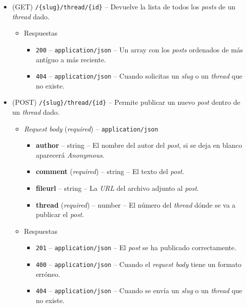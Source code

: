 \documentclass[12pt,a4paper,titlepage]{article}
\begin{document}
    \begin{itemize}
        \item (GET) \texttt{/\{slug\}/thread/\{id\}} -- Devuelve la lista de todos los \textit{posts} de un \textit{thread} dado.
        \begin{itemize}
            \item Respuestas
            \begin{itemize}
                \item \texttt{200} -- \texttt{application/json} -- Un array con los \textit{posts} ordenados de más antíguo a más reciente.
                \item \texttt{404} -- \texttt{application/json} -- Cuando solicitas un \textit{slug} o un \textit{thread} que no existe.
            \end{itemize}
        \end{itemize}
        \item (POST) \texttt{/\{slug\}/thread/\{id\}} -- Permite publicar un nuevo \textit{post} dentro de un \textit{thread} dado.
        \begin{itemize}
            \item \textit{Request body} (\textit{required}) -- \texttt{application/json}
            \begin{itemize}
                \item \textbf{author} -- string -- El nombre del autor del \textit{post}, si se deja en blanco aparecerá \textit{Anonymous}.
                \item \textbf{comment} (\textit{required}) -- string -- El texto del \textit{post}.
                \item \textbf{fileurl} -- string -- La \textit{URL} del archivo adjunto al \textit{post}.
                \item \textbf{thread} (\textit{required}) -- number -- El número del \textit{thread} dónde se va a publicar el \textit{post}.
            \end{itemize}
        \end{itemize}
        \begin{itemize}
            \item Respuestas
            \begin{itemize}
                \item \texttt{201} -- \texttt{application/json} -- El \textit{post} se ha publicado correctamente.
                \item \texttt{400} -- \texttt{application/json} -- Cuando el \textit{request body} tiene un formato erróneo.
                \item \texttt{404} -- \texttt{application/json} -- Cuando se envía un \textit{slug} o un \textit{thread} que no existe.
            \end{itemize}
        \end{itemize}
    \end{itemize}
\end{document}
